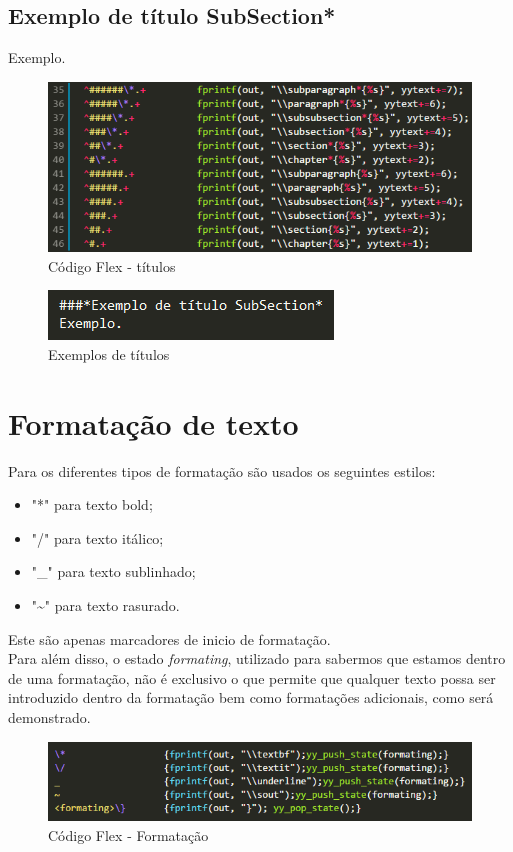 \documentclass{report}
\begin{document}
\subsection*{Exemplo de título SubSection*
}
Exemplo.

\begin{figure}[h]
	\centering
	\includegraphics[scale=0.7]{titulos_flex.png}
	\caption{Código Flex - títulos}
\end{figure}

\begin{figure}[h]
	\centering
	\includegraphics[scale=1]{titulo_source.png}
	\caption{Exemplos de títulos}
\end{figure}

\newpage

\section{Formatação de texto
}
Para os diferentes tipos de formatação são usados os seguintes estilos:
\begin{itemize}
\item  "*" para texto bold;
\item  "/" para texto itálico;
\item  "\_" para texto sublinhado;
\item  "\textasciitilde" para texto rasurado.
\end{itemize}
Este são apenas marcadores de inicio de formatação.
\\
Para além disso, o estado \textit{formating}, utilizado para sabermos 
que estamos dentro de uma formatação, não é exclusivo o que permite 
que qualquer texto possa ser introduzido dentro da formatação 
bem como formatações adicionais, como será demonstrado.

\begin{figure}[h]
	\centering
	\includegraphics[scale=0.9]{formatacao_flex.png}
	\caption{Código Flex - Formatação}
\end{figure}
\end{document}
